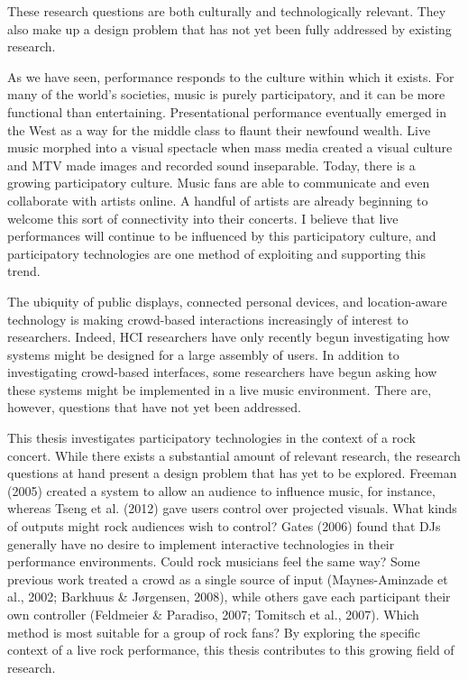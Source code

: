 These research questions are both culturally and technologically relevant. They also make up a design problem that has not yet been fully addressed by existing research.

As we have seen, performance responds to the culture within which it exists. For many of the world's societies, music is purely participatory, and it can be more functional than entertaining. Presentational performance eventually emerged in the West as a way for the middle class to flaunt their newfound wealth. Live music morphed into a visual spectacle when mass media created a visual culture and MTV made images and recorded sound inseparable. Today, there is a growing participatory culture. Music fans are able to communicate and even collaborate with artists online. A handful of artists are already beginning to welcome this sort of connectivity into their concerts. I believe that live performances will continue to be influenced by this participatory culture, and participatory technologies are one method of exploiting and supporting this trend.

The ubiquity of public displays, connected personal devices, and location-aware technology is making crowd-based interactions increasingly of interest to researchers. Indeed, HCI researchers have only recently begun investigating how systems might be designed for a large assembly of users. In addition to investigating crowd-based interfaces, some researchers have begun asking how these systems might be implemented in a live music environment. There are, however, questions that have not yet been addressed.

This thesis investigates participatory technologies in the context of a rock concert. While there exists a substantial amount of relevant research, the research questions at hand present a design problem that has yet to be explored. Freeman (2005) created a system to allow an audience to influence music, for instance, whereas Tseng et al. (2012) gave users control over projected visuals. What kinds of outputs might rock audiences wish to control? Gates (2006) found that DJs generally have no desire to implement interactive technologies in their performance environments. Could rock musicians feel the same way? Some previous work treated a crowd as a single source of input (Maynes-Aminzade et al., 2002; Barkhuus \& J{\o}rgensen, 2008), while others gave each participant their own controller (Feldmeier \& Paradiso, 2007; Tomitsch et al., 2007). Which method is most suitable for a group of rock fans? By exploring the specific context of a live rock performance, this thesis contributes to this growing field of research.

